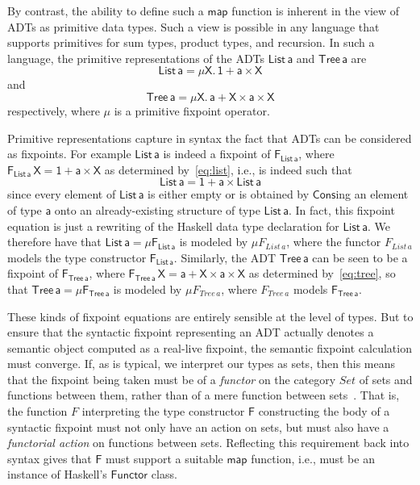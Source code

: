 \documentclass[acmsmall,screen,review,anonymous]{acmart}
\theoremstyle{definition}
\begin{document}
By contrast, the ability to define such a $\mathsf{map}$ function is
inherent in the view of ADTs as primitive data types. Such a view is
possible in any language that supports primitives for sum types,
product types, and recursion. In such a language, the primitive
representations of the ADTs $\mathsf{List\,a}$ and $\mathsf{Tree\,a}$
are
\begin{equation}\label{eq:list}
  \mathsf{List\,a} = \mathsf{\mu X.\, 1 + a \times X}
\end{equation}
and 
\begin{equation}\label{eq:tree}
  \mathsf{Tree\,a} = \mathsf{\mu X.\, a + X \times a \times X}
\end{equation}
respectively, where $\mathsf{\mu}$ is a primitive fixpoint operator.

Primitive representations capture in syntax the fact that ADTs can be
considered as fixpoints. For example $\mathsf{List\,a}$ is indeed a
fixpoint of $\mathsf{F_{List\,a}}$, where $\mathsf{F_{List\,a}\,X} =
\mathsf{1 + a \times X}$ as determined by~\eqref{eq:list}, i.e., is
indeed such that
\[\mathsf{List\,a} = \mathsf{1 + a \times List\,a}\] 
since every element of $\mathsf{List\,a}$ is either empty or is
obtained by $\mathsf{Cons}$ing an element of type $\mathsf{a}$ onto an
already-existing structure of type $\mathsf{List\,a}$. In fact, this
fixpoint equation is just a rewriting of the Haskell data type
declaration for $\mathsf{List\,a}$. We therefore have that
$\mathsf{List\, a} = \mathsf{\mu F_{List\,a}}$ is modeled by $\mu
F_{\mathit{List}\,a}$, where the functor $F_{\mathit{List}\,a}$ models
the type constructor $\mathsf{F_{List\,a}}$. Similarly, the ADT
$\mathsf{Tree\,a}$ can be seen to be a fixpoint of
$\mathsf{F_{Tree\,a}}$, where $\mathsf{F_{Tree\,a}\,X} = \mathsf{a + X
  \times a \times X}$ as determined by~\eqref{eq:tree}, so that
$\mathsf{Tree\, a} = \mathsf{ \mu F_{Tree\,a}}$ is modeled by $\mu
F_{\mathit{Tree}\,a}$, where $F_{\mathit{Tree}\,a} $ models
$\mathsf{F_{Tree\,a}}$.
 
These kinds of fixpoint equations are entirely sensible at the level
of types. But to ensure that the syntactic fixpoint representing an
ADT actually denotes a semantic object computed as a real-live
fixpoint, the semantic fixpoint calculation must converge.  If, as is
typical, we interpret our types as sets, then this means that the
fixpoint being taken must be of a {\em functor} on the category
$\mathit{Set}$ of sets and functions between them, rather than of a
mere function between sets~\cite{tfca}.  That is, the function $F$
interpreting the type constructor $\mathsf{F}$ constructing the body
of a syntactic fixpoint must not only have an action on sets, but must
also have a {\em functorial action} on functions between
sets. Reflecting this requirement back into syntax gives that
$\mathsf{F}$ must support a suitable
$\mathsf{map}$ function, i.e., must be an instance of Haskell's
$\mathsf{Functor}$ class.
\end{document}
